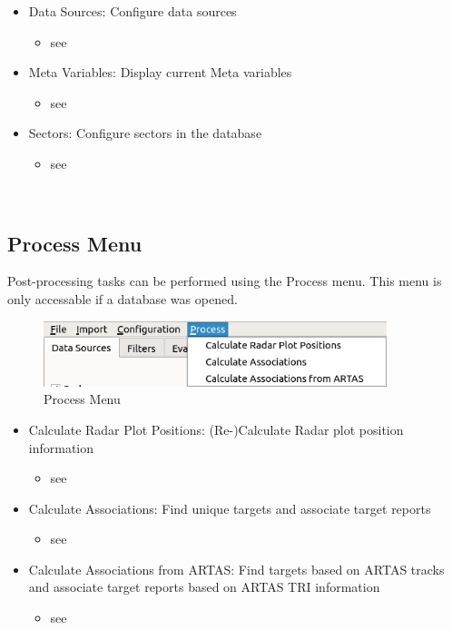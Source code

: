 \begin{itemize}
 \item Data Sources: Configure data sources
  \begin{itemize}
 \item see 
 \end{itemize}
 \item Meta Variables: Display current Meta variables
  \begin{itemize}
 \item see 
 \end{itemize}
 \item Sectors: Configure sectors in the database
  \begin{itemize}
 \item see 
 \end{itemize}
\end{itemize}
\  \\

\subsection{Process Menu}
\label{sec:ui_overview_process_menu}

Post-processing tasks can be performed using the Process menu. This menu is only accessable if a database was opened.

\begin{figure}[H]
  \center
    \includegraphics[width=10cm,frame]{figures/ui_process_menu.png}
  \caption{Process Menu}
\end{figure}

\begin{itemize}
 \item Calculate Radar Plot Positions: (Re-)Calculate Radar plot position information
   \begin{itemize}
 \item see 
 \end{itemize}
 \item Calculate Associations: Find unique targets and associate target reports
   \begin{itemize}
 \item see 
 \end{itemize}
 \item Calculate Associations from ARTAS: Find targets based on ARTAS tracks and associate target reports based on ARTAS TRI information
   \begin{itemize}
 \item see 
 \end{itemize}
\end{itemize}
\  \\

